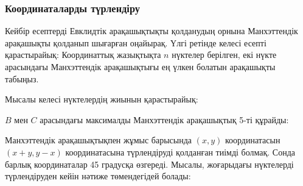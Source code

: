 \subsubsection{Координаталарды түрлендіру}

Кейбір есептерді Евклидтік арақашықтықты қолданудың орнына 
Манхэттендік арақашықты қолданып шығарған оңайырақ. 
Үлгі ретінде келесі есепті қарастырайық:
Координаттық жазықтықта $n$ нүктелер берілген,
екі нүкте арасындағы Манхэттендік арақашықтығы 
ең үлкен болатын арақашықты табыңыз.


Мысалы келесі нүктелердің жиынын қарастырайық:
\begin{center}
\end{center}

$B$ мен $C$ арасындағы максималды Манхэттендік арақашықтық 5-ті құрайды:
\begin{center}
\end{center}

Манхэттендік арақашықтықпен жұмыс барысында $(x,y)$ координатасын $(x+y,y-x)$ координатасына түрлендіруді қолданған тиімді болмақ.
Сонда барлық координаталар 45 градусқа өзгереді. 
Мысалы, жоғарыдағы нүктелерді түрлендіруден кейін нәтиже төмендегідей болады:

